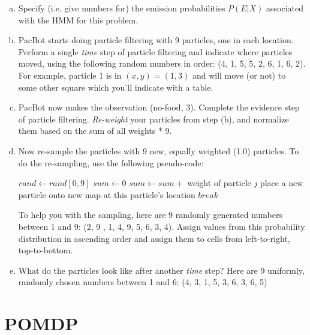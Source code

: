 \documentclass[12pt]{article}
\begin{document}
\begin{enumerate}[a)]

\item{Specify (i.e. give numbers for) the emission probabilities
  $P(E|X)$ associated with the HMM for this problem.}

\item PacBot starts doing particle filtering with 9 particles, one in
  each location.  Perform a single \emph{time} step of particle
  filtering and indicate where particles moved, using the following
  random numbers in order: (4, 1, 5, 5, 2, 6, 1, 6, 2).  For example,
  particle 1 is in $(x,y) = (1,3)$ and will move (or not) to some
  other square which you'll indicate with a table.

\item PacBot now makes the observation (no-food, 3).  Complete the
    evidence step of particle filtering. \emph{Re-weight} your
    particles from step (b), and normalize them based on the sum of
    all weights * 9.

\item Now re-sample the particles with 9 new, equally weighted (1.0)
  particles.  To do the re-sampling, use the following
  pseudo-code:

   \begin{algorithmic}
      \STATE $rand \leftarrow rand[0,9]$
      \STATE $sum \leftarrow  0$
         \STATE $sum \leftarrow sum + $ weight of particle $j$
            \STATE place a new particle onto new map at this particle's location
            \STATE $break$
         \ENDIF
      \ENDFOR
   \ENDFOR
   \end{algorithmic}

   To help you with the sampling, here are 9 randomly generated
   numbers between 1 and 9: (2, 9 , 1, 4, 9, 5, 6, 3, 4). Assign
   values from this probability distribution in ascending order and
   assign them to cells from left-to-right, top-to-bottom.

\item{What do the particles look like after another \emph{time} step?
    Here are 9 uniformly, randomly chosen numbers between 1 and 6: (4,
    3, 1, 5, 3, 6, 3, 6, 5)}

\end{enumerate}

\clearpage

\section{POMDP}
\end{document}
